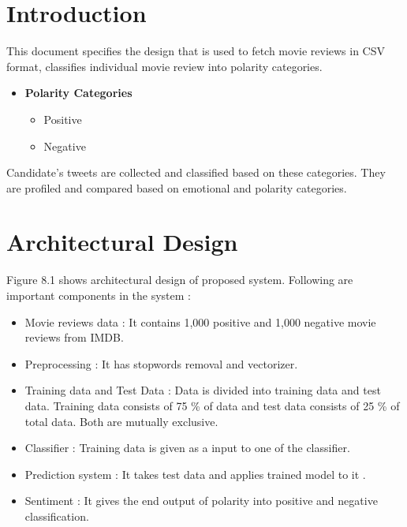 \documentclass[oneside,a4paper,12pt]{pictreport}
\begin{document}
\section{Introduction}
This document specifies the design that is used to fetch movie reviews in CSV format, classifies individual movie review into polarity categories.
\begin{itemize}
 


    \item \textbf{Polarity Categories}
    \begin{itemize}
    \item Positive
    \item Negative
   
    \end{itemize}
\end{itemize}
Candidate's tweets are collected and classified based on these categories. They are profiled and compared based on emotional and polarity categories.
\newpage
\section{Architectural Design}
Figure 8.1 shows architectural design of proposed system. Following are important components in the system :
\begin{itemize}
\item Movie reviews data : It contains 1,000 positive and 1,000 negative movie reviews from IMDB.
\item Preprocessing : It has stopwords removal and vectorizer.
\item Training data and Test Data : Data is divided into training data and test data. Training data consists of 75 \%
of data and test data consists of 25 \% of total data. Both are mutually exclusive.
\item Classifier : Training data is given as a input to one of the classifier.
\item Prediction system : It takes test data and applies trained model to it .
\item Sentiment : It gives the end output of polarity into positive and negative classification.   
\end{itemize}
\end{document}
